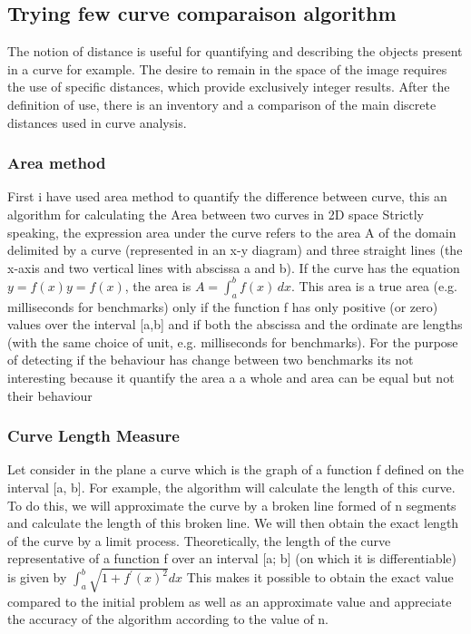 \documentclass{article}
\begin{document}
\subsection{Trying few curve comparaison algorithm}

The notion of distance is useful for quantifying and describing the objects present in
a curve for example. The desire to remain in the space of the image requires the use of specific distances, which provide exclusively integer results. After the definition of use, there is an inventory and a comparison of the main discrete distances used in curve analysis.

\subsubsection{Area method}

First i have used area \cite{jekel2019similarity} method to quantify the difference between curve, this an algorithm for calculating the Area between two curves in 2D space
Strictly speaking, the expression area under the curve refers to the area A of the domain delimited by a curve (represented in an x-y diagram) and three straight lines (the x-axis and two vertical lines with abscissa a and b). If the curve has the equation $y=f(x) y=f(x)$, the area is $A=\int _{a}^{b}f(x)\, {d} x$. This area is a true area (e.g. milliseconds for benchmarks) only if the function f has only positive (or zero) values over the interval [a,b] and if both the abscissa and the ordinate are lengths (with the same choice of unit, e.g. milliseconds for benchmarks).
For the purpose of detecting if the behaviour has change between two benchmarks its not interesting because it quantify the area a a whole and area can be equal but not their behaviour

\subsubsection{Curve Length Measure}

Let consider in the plane a curve which is the graph of a function f defined on the interval [a, b]. For example, the algorithm will calculate the length of this curve. To do this, we will approximate the curve by a broken line formed of n segments and calculate the length of this broken line. We will then obtain the exact length of the curve by a limit process.
Theoretically, the length of the curve representative of a
function f over an interval [a; b] (on which it is differentiable) is given by $\int_{a}^{b} \sqrt{1+f^{\prime}(x)^{2}} d x$
This makes it possible to obtain the exact value compared to the initial problem
as well as an approximate value and appreciate the accuracy of the algorithm
according to the value of n.
\end{document}
